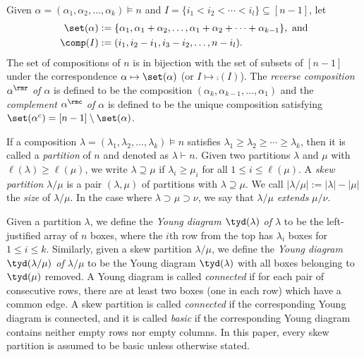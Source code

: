 \documentclass[12pt, reqno]{amsart}
\theoremstyle{definition}
\numberwithin{equation}{section} \numberwithin{figure}{section}
\numberwithin{table}{section}
\begin{document}
Given $\alpha = (\alpha_1,\alpha_2,\ldots,\alpha_k) \models n$ and $I = \{i_1 < i_2 < \cdots < i_{l}\} \subseteq [n-1]$, 
let 
\begin{align*}
    \set(\alpha) &:= \{\alpha_1,\alpha_1+\alpha_2,\ldots, \alpha_1 + \alpha_2 + \cdots + \alpha_{k-1}\}, \text{ and} \\\comp(I) &:= (i_1,i_2 - i_1, i_3 - i_2, \ldots,n-i_{l}).
\end{align*}
The set of compositions of $n$ is in bijection with the set of subsets of $[n-1]$ under the correspondence $\alpha \mapsto \set(\alpha)$ (or $I \mapsto \comp(I)$).
The \emph{reverse composition $\alpha^\rmr$ of $\alpha$} is defined to be the composition $(\alpha_k, \alpha_{k-1}, \ldots, \alpha_1)$ and
the \emph{complement $\alpha^\rmc$ of $\alpha$} is defined to be the unique composition satisfying $\set(\alpha^c) = [n-1] \setminus \set(\alpha)$.


If a composition $\lambda = (\lambda_1, \lambda_2, \ldots, \lambda_k) \models n$ satisfies $\lambda_1 \ge \lambda_2 \ge \cdots \ge \lambda_k$, then it is called a \emph{partition} of $n$ and denoted as $\lambda \vdash n$.
Given two partitions $\lambda$ and $\mu$ with $\ell(\lambda) \ge \ell(\mu)$, we write $\lambda \supseteq \mu$ if $\lambda_i \geq  \mu_i$ for all $1 \le i \le \ell(\mu)$. 
A \emph{skew partition} $\lambda/\mu$ is a pair  $(\lambda, \mu)$ of partitions with $\lambda \supseteq \mu$.
We call $|\lambda/\mu| := |\lambda| - |\mu|$ the \emph{size} of $\lambda/\mu$.
In the case where $\lambda \supset \mu \supset \nu$, we say that  $\lambda/\mu$ \emph{extends} $\mu/\nu$.

Given a partition $\lambda$, we define the \emph{Young diagram $\tyd(\lambda)$ of $\lambda$} to be the left-justified array of $n$ boxes, where the $i$th row from the top has $\lambda_i$ boxes for $1 \le i \le k$.
Similarly, given a skew partition $\lambda / \mu$, we define the \emph{Young diagram $\tyd(\lambda / \mu)$ of $\lambda / \mu$} to be the Young diagram $\tyd(\lambda)$ with all boxes belonging to $\tyd(\mu)$ removed.
A Young diagram is called \emph{connected}
if for each pair of consecutive rows, there are at least two boxes (one in each row) which have a common edge.
A skew partition is called \emph{connected} if the corresponding Young diagram is connected, and it is called \emph{basic} if the corresponding Young diagram contains neither empty rows nor empty columns.
In this paper, every skew partition is assumed to be  basic unless otherwise stated.
\end{document}
